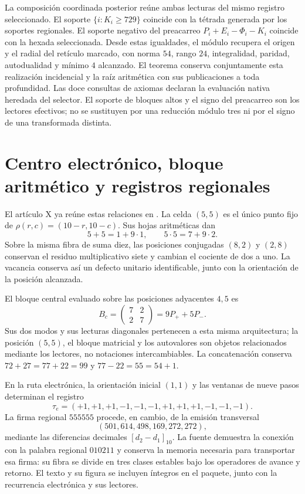 \documentclass[11pt,a4paper]{article}
\begin{document}
La composición coordinada posterior 
reúne ambas lecturas del mismo registro seleccionado. El soporte
$\{i:K_i\geq729\}$ coincide con la tétrada generada por los soportes
regionales. El soporte negativo del preacarreo
$P_i+E_i-\Phi_i-K_i$ coincide con la hexada seleccionada. Desde estas
igualdades, el módulo recupera el origen y el radial del retículo marcado,
con norma $54$, rango $24$, integralidad, paridad, autodualidad y mínimo
$4$ alcanzado. El teorema
 conserva conjuntamente
esta realización incidencial y la raíz aritmética con sus publicaciones
a toda profundidad. Las doce consultas de axiomas declaran la evaluación
nativa heredada del selector. El soporte de bloques altos y el signo del
preacarreo son los lectores efectivos; no se sustituyen por una reducción
módulo tres ni por el signo de una transformada distinta.

\section{Centro electrónico, bloque aritmético y registros regionales}

El artículo X ya reúne estas relaciones en
. La celda $(5,5)$ es el
único punto fijo de $\rho(r,c)=(10-r,10-c)$. Sus hojas aritméticas dan
\[
 5+5=1+9\cdot1,\qquad 5\cdot5=7+9\cdot2.
\]
Sobre la misma fibra de suma diez, las posiciones conjugadas $(8,2)$ y
$(2,8)$ conservan el residuo multiplicativo siete y cambian el cociente
de dos a uno. La vacancia conserva así un defecto unitario identificable,
junto con la orientación de la posición alcanzada.

El bloque central evaluado sobre las posiciones adyacentes $4,5$ es
\[
 B_c=\begin{pmatrix}7&2\\2&7\end{pmatrix}=9P_++5P_-.
\]
Sus dos modos y sus lecturas diagonales pertenecen a esta misma
arquitectura; la posición $(5,5)$, el bloque matricial y los autovalores
son objetos relacionados mediante los lectores, no notaciones
intercambiables. La concatenación conserva
$72+27=77+22=99$ y $77-22=55=54+1$.

En la ruta electrónica, la orientación inicial $(1,1)$ y las ventanas de
nueve pasos determinan el registro
\[
 \tau_e=(+1,+1,+1,-1,-1,-1,+1,+1,+1,-1,-1,-1).
\]
La firma regional $555555$ procede, en cambio, de la emisión transversal
\[
 (501,614,498,169,272,272),
\]
mediante las diferencias decimales
$[d_2-d_1]_{10}$. La fuente demuestra la conexión con la palabra
regional $010211$ y conserva la memoria necesaria para transportar esa
firma: su fibra se divide en tres clases estables bajo los operadores
de avance y retorno. El texto y su figura se incluyen íntegros en el
paquete, junto con la recurrencia electrónica y sus lectores.
\end{document}
